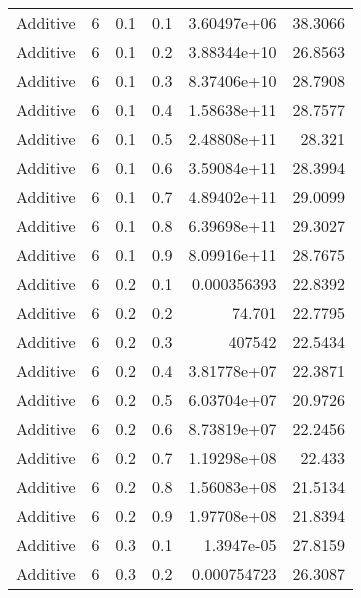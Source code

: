 \documentclass{article}
\begin{document}
\begin{longtable}[H]{lrrrrr}
 Additive       &       6 &   0.1 &            0.1 &      3.60497e+06 &         38.3066 \\
 Additive       &       6 &   0.1 &            0.2 &      3.88344e+10 &         26.8563 \\
 Additive       &       6 &   0.1 &            0.3 &      8.37406e+10 &         28.7908 \\
 Additive       &       6 &   0.1 &            0.4 &      1.58638e+11 &         28.7577 \\
 Additive       &       6 &   0.1 &            0.5 &      2.48808e+11 &         28.321  \\
 Additive       &       6 &   0.1 &            0.6 &      3.59084e+11 &         28.3994 \\
 Additive       &       6 &   0.1 &            0.7 &      4.89402e+11 &         29.0099 \\
 Additive       &       6 &   0.1 &            0.8 &      6.39698e+11 &         29.3027 \\
 Additive       &       6 &   0.1 &            0.9 &      8.09916e+11 &         28.7675 \\
 Additive       &       6 &   0.2 &            0.1 &      0.000356393 &         22.8392 \\
 Additive       &       6 &   0.2 &            0.2 &     74.701       &         22.7795 \\
 Additive       &       6 &   0.2 &            0.3 & 407542           &         22.5434 \\
 Additive       &       6 &   0.2 &            0.4 &      3.81778e+07 &         22.3871 \\
 Additive       &       6 &   0.2 &            0.5 &      6.03704e+07 &         20.9726 \\
 Additive       &       6 &   0.2 &            0.6 &      8.73819e+07 &         22.2456 \\
 Additive       &       6 &   0.2 &            0.7 &      1.19298e+08 &         22.433  \\
 Additive       &       6 &   0.2 &            0.8 &      1.56083e+08 &         21.5134 \\
 Additive       &       6 &   0.2 &            0.9 &      1.97708e+08 &         21.8394 \\
 Additive       &       6 &   0.3 &            0.1 &      1.3947e-05  &         27.8159 \\
 Additive       &       6 &   0.3 &            0.2 &      0.000754723 &         26.3087 \\

\end{longtable}
\end{document}
